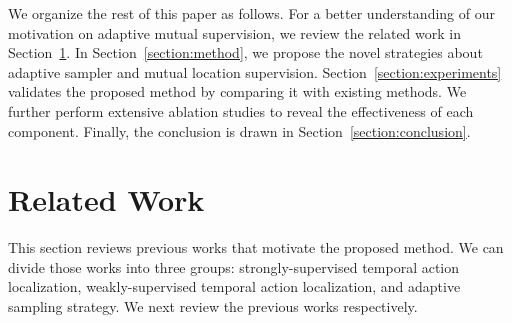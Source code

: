 \documentclass[journal]{IEEEtran}
\begin{document}
We organize the rest of this paper as follows. For a better understanding of our motivation on adaptive mutual supervision, we review the related work in Section~\ref{section:relatedwork}. In Section~\ref{section:method}, we propose the novel strategies about adaptive sampler and mutual location supervision. Section~\ref{section:experiments} validates the proposed method by comparing it with existing methods. We further perform extensive ablation studies to reveal the effectiveness of each component. Finally, the conclusion is drawn in Section~\ref{section:conclusion}.



\section{Related Work}  \label{section:relatedwork}
This section reviews previous works that motivate the proposed method. We can divide those works into three groups: strongly-supervised temporal action localization, weakly-supervised temporal action localization, and adaptive sampling strategy. We next review the previous works respectively.
\end{document}
